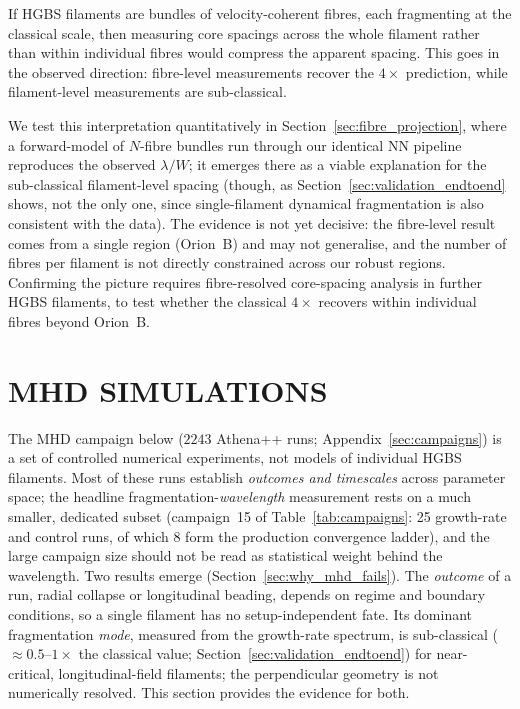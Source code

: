 \documentclass[usenatbib,twoside,twocolumn]{mnras}
\begin{document}
If HGBS filaments are bundles of velocity-coherent fibres, each fragmenting at the classical scale, then measuring core spacings across the whole filament rather than within individual fibres would compress the apparent spacing. This goes in the observed direction: fibre-level measurements recover the $4\times$ prediction, while filament-level measurements are sub-classical.

We test this interpretation quantitatively in Section~\ref{sec:fibre_projection}, where a forward-model of $N$-fibre bundles run through our identical NN pipeline reproduces the observed $\lambda/W$; it emerges there as a viable explanation for the sub-classical filament-level spacing (though, as Section~\ref{sec:validation_endtoend} shows, not the only one, since single-filament dynamical fragmentation is also consistent with the data). The evidence is not yet decisive: the \citet{Yang2024} fibre-level result comes from a single region (Orion~B) and may not generalise, and the number of fibres per filament is not directly constrained across our robust regions. Confirming the picture requires fibre-resolved core-spacing analysis in further HGBS filaments, to test whether the classical $4\times$ recovers within individual fibres beyond Orion~B.

\section{MHD SIMULATIONS}

The MHD campaign below ($2243$ Athena++ runs; Appendix~\ref{sec:campaigns}) is a set of controlled numerical experiments, not models of individual HGBS filaments. Most of these runs establish \emph{outcomes and timescales} across parameter space; the headline fragmentation-\emph{wavelength} measurement rests on a much smaller, dedicated subset (campaign~15 of Table~\ref{tab:campaigns}: 25 growth-rate and control runs, of which 8 form the production convergence ladder), and the large campaign size should not be read as statistical weight behind the wavelength. Two results emerge (Section~\ref{sec:why_mhd_fails}). The \emph{outcome} of a run, radial collapse or longitudinal beading, depends on regime and boundary conditions, so a single filament has no setup-independent fate. Its dominant fragmentation \emph{mode}, measured from the growth-rate spectrum, is sub-classical ($\approx0.5$--$1\times$ the classical value; Section~\ref{sec:validation_endtoend}) for near-critical, longitudinal-field filaments; the perpendicular geometry is not numerically resolved. This section provides the evidence for both.
\end{document}
